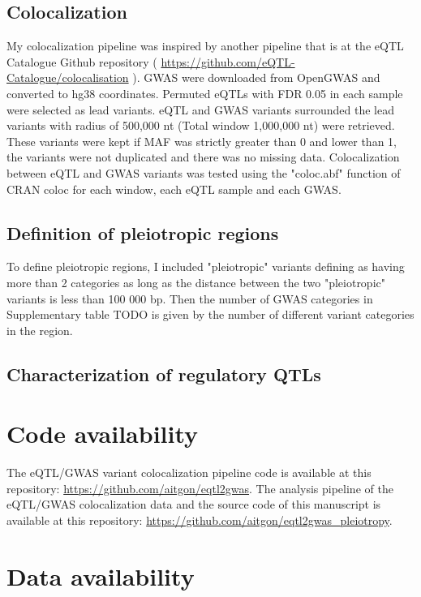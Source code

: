 \subsection*{Colocalization}

My colocalization pipeline was inspired by another pipeline that is at the eQTL Catalogue Github repository ( \url{https://github.com/eQTL-Catalogue/colocalisation} ).
%
GWAS were downloaded from OpenGWAS and converted to hg38 coordinates.
%
Permuted eQTLs with FDR 0.05 in each sample were selected as lead variants.
%
eQTL and GWAS variants surrounded the lead variants with radius of 500,000 nt (Total window 1,000,000 nt) were retrieved.
%
These variants were kept if MAF was strictly greater than 0 and lower than 1, the variants were not duplicated and there was no missing data.
%
Colocalization between eQTL and GWAS variants was tested using the "coloc.abf" function of CRAN coloc for each window, each eQTL sample and each GWAS.

\subsection*{Definition of pleiotropic regions}

To define pleiotropic regions, I included "pleiotropic" variants defining as having more than 2 categories as long as the distance between the two "pleiotropic" variants is less than 100 000 bp.
%
Then the number of GWAS categories in Supplementary table TODO is given by the number of different variant categories in the region.

\subsection*{Characterization of regulatory QTLs}

\section*{Code availability}

The eQTL/GWAS variant colocalization pipeline code is available at this repository: \url{https://github.com/aitgon/eqtl2gwas}.
%
The analysis pipeline of the eQTL/GWAS colocalization data and the source code of this manuscript is available at this repository: \url{https://github.com/aitgon/eqtl2gwas_pleiotropy}.

\section*{Data availability}

